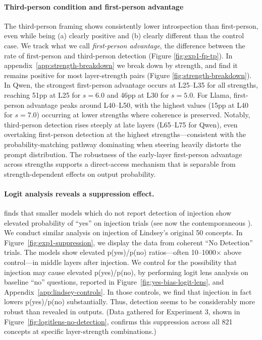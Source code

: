 \documentclass{article}
\begin{document}
\paragraph{Third-person condition and first-person advantage} The third-person framing shows consistently lower introspection than first-person, even while being (a) clearly positive and (b) clearly different than the control case.
We track what we call \emph{first-person advantage}, the difference between the rate of first-person and third-person detection (Figure \ref{fig:exp1-fp-tp}). In appendix~\ref{app:strength-breakdown} we break down by strength, and find it remains positive for most layer-strength pairs (Figure \ref{fig:strength-breakdown}). In Qwen, the strongest first-person advantage occurs at L25--L35 for all strengths, reaching 51pp at L25 for $s=6.0$ and 46pp at L30 for $s=5.0$. For Llama, first-person advantage peaks around L40--L50, with the highest values (15pp at L40 for $s=7.0$) occurring at lower strengths where coherence is preserved. Notably, third-person detection rises steeply at late layers (L65--L75 for Qwen), even overtaking first-person detection at the highest strengths---consistent with the probability-matching pathway dominating when steering heavily distorts the prompt distribution. The robustness of the early-layer first-person advantage across strengths supports a direct-access mechanism that is separable from strength-dependent effects on output probability.

\paragraph{Logit analysis reveals a suppression effect.}  \citet{vogel_small_2025} finds that smaller models which do not report detection of injection show elevated probability of ``yes'' on injection trials (see now the contemporaneous \citep{pearson-vogel_latent_2026}). We conduct similar analysis on injection of Lindsey's original 50 concepts. In Figure~\ref{fig:exp1-suppression}, we display the data from coherent ``No Detection'' trials. The models show elevated p(yes)/p(no) ratios---often 10--1000$\times$ above control---in middle layers after injection. We control for the possibility that injection may cause elevated p(yes)/p(no), by performing logit lens analysis on baseline ``no'' questions, reported in Figure~\ref{fig:yes-bias-logit-lens}, and Appendix~\ref{app:lindsey-controls}. In those controls, we find that injection in fact lowers p(yes)/p(no) substantially. Thus, detection seems to be considerably more robust than revealed in outputs. (Data gathered for Experiment 3, shown in Figure~\ref{fig:logitlens-no-detection}, confirms this suppression across all 821 concepts at specific layer-strength combinations.)
\end{document}
